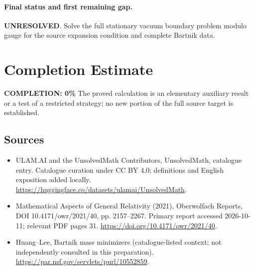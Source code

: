 \documentclass[11pt]{article}
\begin{document}
\paragraph{Final status and first remaining gap.}
\textbf{UNRESOLVED}. Solve the full stationary vacuum boundary problem modulo gauge for the source expansion condition and complete Bartnik data.

\section{Completion Estimate}
\noindent\textbf{COMPLETION: 0\%}
The proved calculation is an elementary auxiliary result or a test of a restricted strategy; no new portion of the full source target is established.

\subsection{Sources}
\begin{itemize}
\item[\hypertarget{source:statement:1}{S1}] ULAM.AI and the UnsolvedMath Contributors, UnsolvedMath, catalogue entry. Catalogue curation under CC BY 4.0; definitions and English exposition added locally.
\url{https://huggingface.co/datasets/ulamai/UnsolvedMath}.
\item[\hypertarget{source:statement:2}{S2}] Mathematical Aspects of General Relativity (2021), Oberwolfach Reports, DOI 10.4171/owr/2021/40, pp. 2157--2267. Primary report accessed 2026-10-11; relevant PDF pages 31.
\url{https://doi.org/10.4171/owr/2021/40}.
\item[\hypertarget{source:statement:3}{S3}] Huang--Lee, Bartnik mass minimizers (catalogue-listed context; not independently consulted in this preparation).
\url{https://par.nsf.gov/servlets/purl/10552859}.
\end{itemize}
\label{end:statement}
\end{document}
